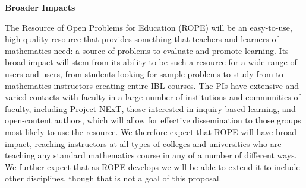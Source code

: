 \documentclass[11pt]{article}
\begin{document}
\bigskip\bigskip
\noindent
{\large \textbf{Broader Impacts}}

The Resource of Open Problems for Education (ROPE) will be an easy-to-use,
high-quality resource that provides something that teachers and learners
of mathematics need: a source of problems to evaluate and promote
learning.  Its broad impact will stem from its ability to be such a
resource for a wide range of users and users, from students looking for
sample problems to study from to mathematics instructors creating entire
IBL courses.  The PIs have extensive and varied contacts with faculty in a
large number of institutions and communities of faculty, including Project
NExT, those interested in inquiry-based learning, and open-content
authors, which will allow for effective dissemination to those groups most
likely to use the resource.  We therefore expect that ROPE will have broad
impact, reaching instructors at all types of colleges and universities who
are teaching any standard mathematics course in any of a number of
different ways.  We further expect that as ROPE develops we will be able
to extend it to include other disciplines, though that is not a goal of
this proposal.
\end{document}
